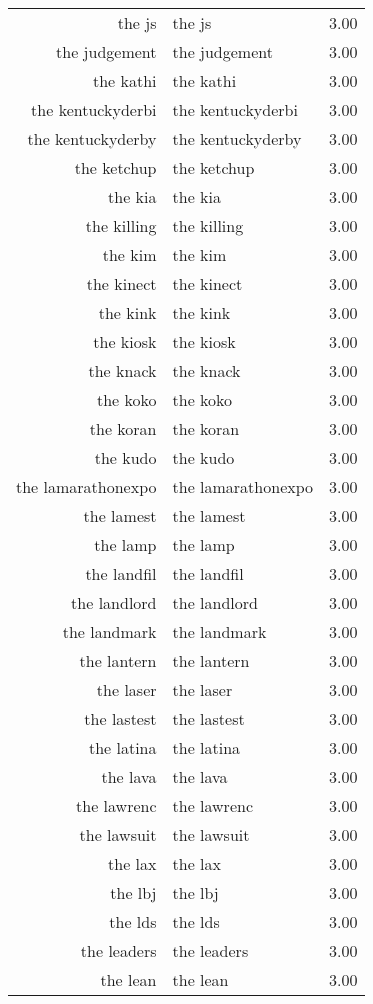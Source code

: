 \begin{table}[ht]
\begin{tabular}{rlr}
  the js & the js & 3.00 \\ 
  the judgement & the judgement & 3.00 \\ 
  the kathi & the kathi & 3.00 \\ 
  the kentuckyderbi & the kentuckyderbi & 3.00 \\ 
  the kentuckyderby & the kentuckyderby & 3.00 \\ 
  the ketchup & the ketchup & 3.00 \\ 
  the kia & the kia & 3.00 \\ 
  the killing & the killing & 3.00 \\ 
  the kim & the kim & 3.00 \\ 
  the kinect & the kinect & 3.00 \\ 
  the kink & the kink & 3.00 \\ 
  the kiosk & the kiosk & 3.00 \\ 
  the knack & the knack & 3.00 \\ 
  the koko & the koko & 3.00 \\ 
  the koran & the koran & 3.00 \\ 
  the kudo & the kudo & 3.00 \\ 
  the lamarathonexpo & the lamarathonexpo & 3.00 \\ 
  the lamest & the lamest & 3.00 \\ 
  the lamp & the lamp & 3.00 \\ 
  the landfil & the landfil & 3.00 \\ 
  the landlord & the landlord & 3.00 \\ 
  the landmark & the landmark & 3.00 \\ 
  the lantern & the lantern & 3.00 \\ 
  the laser & the laser & 3.00 \\ 
  the lastest & the lastest & 3.00 \\ 
  the latina & the latina & 3.00 \\ 
  the lava & the lava & 3.00 \\ 
  the lawrenc & the lawrenc & 3.00 \\ 
  the lawsuit & the lawsuit & 3.00 \\ 
  the lax & the lax & 3.00 \\ 
  the lbj & the lbj & 3.00 \\ 
  the lds & the lds & 3.00 \\ 
  the leaders & the leaders & 3.00 \\ 
  the lean & the lean & 3.00 \\ 

\end{tabular}
\end{table}

